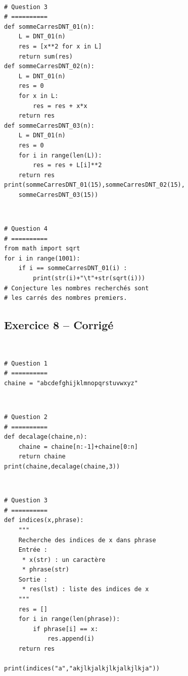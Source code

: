 \documentclass[10pt,fleqn]{article} %
\begin{document}
\begin{corrige}
$\quad$
\begin{lstlisting}
# Question 3
# ==========
def sommeCarresDNT_01(n):
    L = DNT_01(n)
    res = [x**2 for x in L]
    return sum(res)
def sommeCarresDNT_02(n):
    L = DNT_01(n)
    res = 0
    for x in L:
        res = res + x*x
    return res
def sommeCarresDNT_03(n):
    L = DNT_01(n)
    res = 0
    for i in range(len(L)):
        res = res + L[i]**2
    return res
print(sommeCarresDNT_01(15),sommeCarresDNT_02(15),
    sommeCarresDNT_03(15))
\end{lstlisting}
\end{corrige}


\begin{corrige}
$\quad$
\begin{lstlisting}
# Question 4
# ==========
from math import sqrt
for i in range(1001):
    if i == sommeCarresDNT_01(i) :
        print(str(i)+"\t"+str(sqrt(i)))
# Conjecture les nombres recherchés sont 
# les carrés des nombres premiers. 
\end{lstlisting}
\end{corrige}


\subsection*{Exercice 8 -- Corrigé}
\begin{corrige}
$\quad$
\begin{lstlisting}
# Question 1 
# ==========
chaine = "abcdefghijklmnopqrstuvwxyz"
\end{lstlisting}
\end{corrige}

\begin{corrige}
$\quad$
\begin{lstlisting}
# Question 2
# ==========
def decalage(chaine,n):
    chaine = chaine[n:-1]+chaine[0:n]
    return chaine
print(chaine,decalage(chaine,3))
\end{lstlisting}
\end{corrige}

\begin{corrige}
$\quad$
\begin{lstlisting}
# Question 3
# ==========
def indices(x,phrase):
    """
    Recherche des indices de x dans phrase
    Entrée : 
     * x(str) : un caractère
     * phrase(str)
    Sortie : 
     * res(lst) : liste des indices de x
    """
    res = []
    for i in range(len(phrase)):
        if phrase[i] == x:
            res.append(i)
    return res

print(indices("a","akjlkjalkjlkjalkjlkja"))
\end{lstlisting}
\end{corrige}
\end{document}
